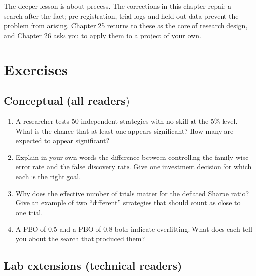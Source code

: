 The deeper lesson is about process. The corrections in this chapter repair a search after the fact; pre-registration, trial logs and held-out data prevent the problem from arising. Chapter 25 returns to these as the core of research design, and Chapter 26 asks you to apply them to a project of your own.

\section*{Exercises}

\subsection*{Conceptual (all readers)}

\begin{enumerate}
  \item A researcher tests 50 independent strategies with no skill at the 5\% level. What is the chance that at least one appears significant? How many are expected to appear significant?
  \item Explain in your own words the difference between controlling the family-wise error rate and the false discovery rate. Give one investment decision for which each is the right goal.
  \item Why does the effective number of trials matter for the deflated Sharpe ratio? Give an example of two ``different'' strategies that should count as close to one trial.
  \item A PBO of 0.5 and a PBO of 0.8 both indicate overfitting. What does each tell you about the search that produced them?
\end{enumerate}

\subsection*{Lab extensions (technical readers)}

